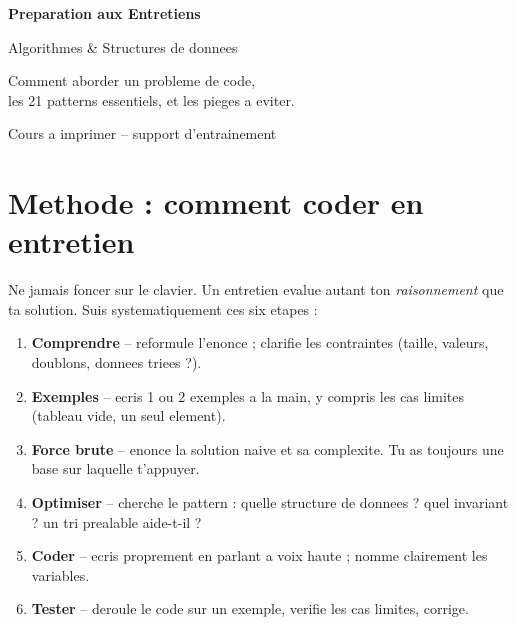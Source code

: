 \documentclass[11pt,a4paper]{article}
\begin{document}
\begin{titlepage}
\centering
\vspace*{3cm}
{\color{primary}\Huge\bfseries Preparation aux Entretiens\par}
\vspace{0.6cm}
{\color{accent}\LARGE Algorithmes \& Structures de donnees\par}
\vspace{1.2cm}
{\large Comment aborder un probleme de code,\\
les 21 patterns essentiels, et les pieges a eviter.\par}
\vfill
{\color{codecom}\large Cours a imprimer -- support d'entrainement\par}
\vspace{2cm}
\end{titlepage}

\tableofcontents
\newpage

\section{Methode : comment coder en entretien}
Ne jamais foncer sur le clavier. Un entretien evalue autant ton \emph{raisonnement}
que ta solution. Suis systematiquement ces six etapes :

\begin{enumerate}[leftmargin=*,itemsep=4pt]
  \item \textbf{Comprendre} -- reformule l'enonce ; clarifie les contraintes
        (taille, valeurs, doublons, donnees triees ?).
  \item \textbf{Exemples} -- ecris 1 ou 2 exemples a la main, y compris les cas
        limites (tableau vide, un seul element).
  \item \textbf{Force brute} -- enonce la solution naive et sa complexite.
        Tu as toujours une base sur laquelle t'appuyer.
  \item \textbf{Optimiser} -- cherche le pattern : quelle structure de donnees ?
        quel invariant ? un tri prealable aide-t-il ?
  \item \textbf{Coder} -- ecris proprement en parlant a voix haute ; nomme
        clairement les variables.
  \item \textbf{Tester} -- deroule le code sur un exemple, verifie les cas
        limites, corrige.
\end{enumerate}
\end{document}
